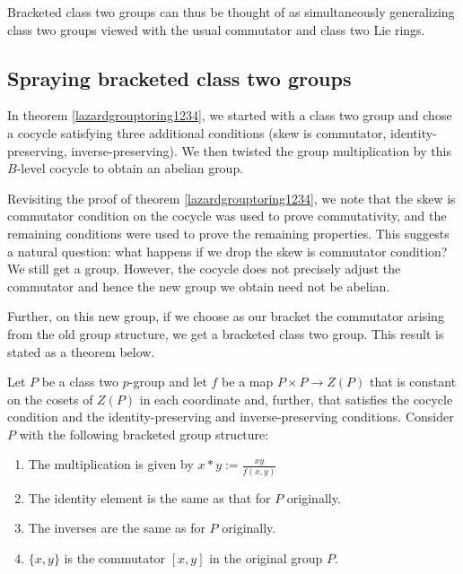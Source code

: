 \documentclass[10pt]{amsart}
\begin{document}
Bracketed class two groups can thus be thought of as simultaneously
generalizing class two groups viewed with the usual commutator and
class two Lie rings.

\subsection{Spraying bracketed class two groups}

In theorem \ref{lazardgrouptoring1234}, we started with a class two
group and chose a cocycle satisfying three additional conditions (skew
is commutator, identity-preserving, inverse-preserving). We then
twisted the group multiplication by this $B$-level cocycle to obtain
an abelian group.

Revisiting the proof of theorem \ref{lazardgrouptoring1234}, we note
that the skew is commutator condition on the cocycle was used to prove
commutativity, and the remaining conditions were used to prove the
remaining properties. This suggests a natural question: what happens
if we drop the skew is commutator condition? We still get a
group. However, the cocycle does not precisely adjust the commutator
and hence the new group we obtain need not be abelian.

Further, on this new group, if we choose as our bracket the commutator
arising from the old group structure, we get a bracketed class two
group. This result is stated as a theorem below.

\begin{theorem}
  Let $P$ be a class two $p$-group and let $f$ be a map $P \times P
  \to Z(P)$ that is constant on the cosets of $Z(P)$ in each
  coordinate and, further, that satisfies the cocycle condition and
  the identity-preserving and inverse-preserving conditions. Consider
  $P$ with the following bracketed group structure:

  \begin{enumerate}
  \item The multiplication is given by $x * y :=
  \frac{xy}{f(x,y)}$
  \item The identity element is the same as that for $P$ originally.
  \item The inverses are the same as for $P$ originally.
  \item $\{ x,y \}$ is the commutator $[x,y]$ in the original group
    $P$.
  \end{enumerate}
\end{theorem}
\end{document}
